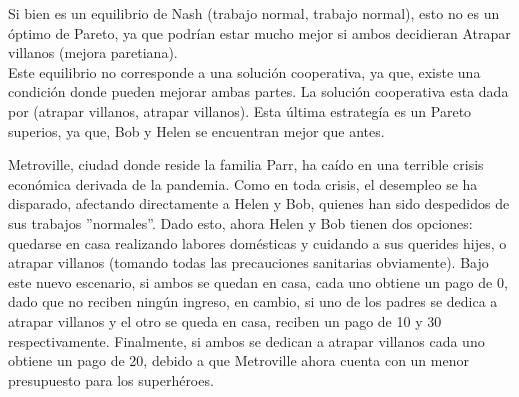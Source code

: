 \documentclass{exam}
\begin{document}
\begin{enumerate}[label=(\alph*), ref=\alph*]
\begin{solution}
\begin{center}
\end{center}



Si bien es un equilibrio de Nash (trabajo normal, trabajo normal), esto no es un óptimo de Pareto, ya que podrían estar mucho mejor si ambos decidieran Atrapar villanos (mejora paretiana). \\

Este equilibrio no corresponde a una solución cooperativa, ya que, existe una condición donde pueden mejorar ambas partes. La solución cooperativa esta dada por (atrapar villanos, atrapar villanos). Esta última estrategía es un Pareto superios, ya que, Bob y Helen se encuentran mejor que antes.
    \end{solution}
  \end{enumerate}

Metroville, ciudad donde reside la familia Parr, ha caído en una terrible crisis económica derivada de la pandemia. Como en toda crisis, el desempleo se ha disparado, afectando directamente a Helen y Bob, quienes han sido despedidos de sus trabajos ”normales”. Dado esto, ahora Helen y Bob tienen dos opciones: quedarse en casa realizando labores domésticas y cuidando a sus querides hijes, o atrapar villanos (tomando todas las precauciones sanitarias obviamente). Bajo este nuevo escenario, si ambos se quedan en casa, cada uno obtiene un pago de 0, dado que no reciben ningún ingreso, en cambio, si uno de los padres se dedica a atrapar villanos y el otro se queda en casa, reciben un pago de 10 y 30 respectivamente. Finalmente, si ambos se dedican a atrapar villanos cada uno obtiene un pago de 20, debido a que Metroville ahora cuenta con un menor presupuesto para los superhéroes.
\end{document}
